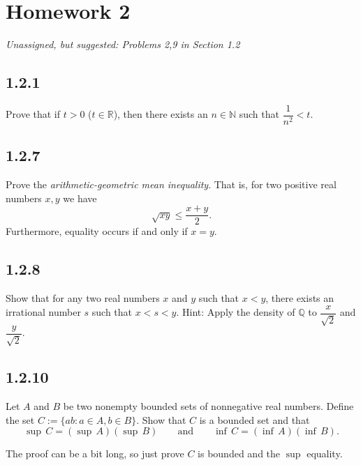 \documentclass{article}
\newcommand{\unassigned}{
\flushleft 
Unassigned, but suggested: Problems 2,9 in Section 1.2
}
\newcommand{\R}{{\mathbb{R}}}
\newcommand{\N}{{\mathbb{N}}}
\newcommand{\Q}{{\mathbb{Q}}}
\newcommand{\rednote}[1]{{\color{red} #1}}
\begin{document}
\setcounter{section}{1}
\section{Homework 2}
\emph{ \unassigned}

\subsection{1.2.1}Prove that
if $t > 0$ ($t \in \R$), then there exists an $n \in \N$ such that
$\dfrac{1}{n^2} < t$.
\mysolution{

} %



\subsection{1.2.7}Prove the \emph{arithmetic-geometric mean inequality}.  That is, 
for two positive real numbers $x,y$ we have
\begin{equation*}
\sqrt{xy} \leq \frac{x+y}{2} .
\end{equation*}
Furthermore, equality occurs if and only if $x=y$.
\mysolution{

} %


\subsection{1.2.8}Show that for any two real numbers $x$ and $y$ such that $x < y$, there
exists an irrational number $s$ such that $x < s < y$.  Hint:
Apply the density of $\Q$ to $\dfrac{x}{\sqrt{2}}$ and
$\dfrac{y}{\sqrt{2}}$.
\mysolution{

} %



\subsection{1.2.10}Let $A$ and $B$ be two nonempty bounded sets of nonnegative real numbers.
Define the set
$C := \{ ab : a \in A, b \in B \}$.
Show that $C$ is a bounded set and that
\begin{equation*}
\sup\,C = (\sup\,A )( \sup\,B) 
\qquad \text{and} \qquad
\inf\,C = (\inf\,A )( \inf\,B).
\end{equation*}

\rednote{The proof can be a bit long, so just prove $C$ is bounded and the $\sup$ equality.}
\mysolution{

} %
\end{document}
